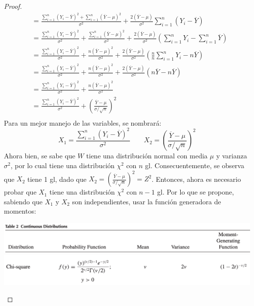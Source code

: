 \documentclass[a4paper,12pt]{article}
\begin{document}
\begin{enumerate}
\begin{proof}
\begin{align*}
&=\frac{\sum_{i=1}^{n}\left(Y_{i}-\overline{Y}\right)^{2}+\sum_{i=1}^{n}(\overline{Y}-\mu)^{2}}{\sigma^{2}}+\frac{2(\overline{Y}-\mu)}{\sigma^{2}} \sum_{i=1}^{n}\left(Y_{i}-\overline{Y}\right)\\
&= \frac{\sum_{i=1}^{n}\left(Y_{i}-\overline{Y}\right)^{2}}{\sigma^{2}}+\frac{\sum_{i=1}^{n}(\overline{Y}-\mu)^{2}}{\sigma^{2}}+ \frac{2(\overline{Y}-\mu)}{\sigma^{2}} \left(\sum_{i=1}^{n}Y_{i}-\sum_{i=1}^{n}\overline{Y}\right)\\
&=\frac{\sum_{i=1}^{n}\left(Y_{i}-\overline{Y}\right)^{2}}{\sigma^{2}}+\frac{n(\overline{Y}-\mu)^{2}}{\sigma^{2}}+ \frac{2(\overline{Y}-\mu)}{\sigma^{2}} \left(\frac{n}{n}\sum_{i=1}^{n}Y_{i}-n\overline{Y}\right)\\
&=\frac{\sum_{i=1}^{n}\left(Y_{i}-\overline{Y}\right)^{2}}{\sigma^{2}}+\frac{n(\overline{Y}-\mu)^{2}}{\sigma^{2}}+ \frac{2(\overline{Y}-\mu)}{\sigma^{2}} \left(n\overline{Y}-n\overline{Y}\right)\\
&= \frac{\sum_{i=1}^{n}\left(Y_{i}-\overline{Y}\right)^{2}}{\sigma^{2}}+\frac{n(\overline{Y}-\mu)^{2}}{\sigma^{2}}\\
&= \frac{\sum_{i=1}^{n}\left(Y_{i}-\overline{Y}\right)^{2}}{\sigma^{2}}+\left(\frac{\overline{Y}-\mu}{\sigma/\sqrt{n}}\right)^2\\
\end{align*}
Para un mejor manejo de las variables, se nombrará: 
$$X_1=\frac{\sum_{i=1}^{n}\left(Y_{i}-\overline{Y}\right)^{2}}{\sigma^{2}} \qquad X_2=\left(\frac{\overline{Y}-\mu}{\sigma/\sqrt{n}}\right)^2$$
Ahora bien, se sabe que $W$ tiene una distribución normal con media $\mu$ y varianza $\sigma^2$, por lo cual tiene una distribución $\chi^2$ con $n$ gl. Consecuentemente, se observa que $X_2$ tiene 1 gl, dado que $X_2=\left(\frac{\overline{Y}-\mu}{\sigma/\sqrt{n}}\right)^2=Z^2$. Entonces, ahora es necesario probar que $X_1$ tiene una distribución $\chi^2$ con $n-1$ gl. Por lo que se propone, sabiendo que $X_1$ y $X_2$ son independientes, usar la función generadora de momentos: 
\begin{center}
    \includegraphics[scale=0.4]{Images/names.png}
    \includegraphics[scale=0.4]{Images/Chi.png}

\end{center}
\end{proof}
\end{enumerate}
\end{document}
